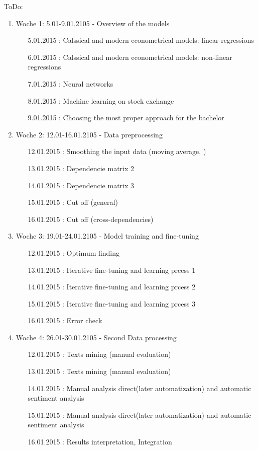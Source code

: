 \documentclass {article}
\begin{document}
ToDo:
\begin{enumerate}
	\item Woche 1: 5.01-9.01.2105 - Overview of the models 
	\begin{enumerate}
		\item[5.01.2015]: Calssical and modern econometrical models:  linear regressions
		\item[6.01.2015]: Calssical and modern econometrical models:  non-linear regressions
		\item[7.01.2015]: Neural networks
		\item[8.01.2015]: Machine learning on stock exchange
		\item[9.01.2015]: Choosing the most proper approach for the bachelor
	\end{enumerate}
	\item Woche 2: 12.01-16.01.2105 - Data preprocessing
	\begin{enumerate}
		\item[12.01.2015]: Smoothing the input data (moving average, )
		\item[13.01.2015]: Dependencie matrix 2
		\item[14.01.2015]: Dependencie matrix 3
		\item[15.01.2015]: Cut off (general)
		\item[16.01.2015]: Cut off (cross-dependencies)
	\end{enumerate}
	\item Woche 3: 19.01-24.01.2105 - Model training and fine-tuning
	\begin{enumerate}
		\item[12.01.2015]: Optimum finding
		\item[13.01.2015]: Iterative fine-tuning and learning prcess 1
		\item[14.01.2015]: Iterative fine-tuning and learning prcess 2
		\item[15.01.2015]: Iterative fine-tuning and learning prcess 3
		\item[16.01.2015]: Error check
	\end{enumerate}
	\item Woche 4: 26.01-30.01.2105 - Second Data processing
	\begin{enumerate}
		\item[12.01.2015]: Texts mining (manual evaluation) 
		\item[13.01.2015]: Texts mining (manual evaluation)
		\item[14.01.2015]: Manual analysis direct(later automatization) and automatic sentiment analysis
		\item[15.01.2015]: Manual analysis direct(later automatization) and automatic sentiment analysis
		\item[16.01.2015]: Results interpretation, Integration 
	\end{enumerate}
\end{enumerate}
\end{document}
